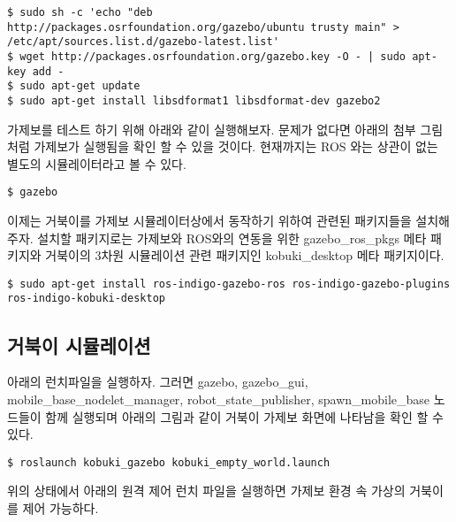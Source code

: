 \vspace{\baselineskip}
\begin{lstlisting}[language=ROS]
$ sudo sh -c 'echo "deb http://packages.osrfoundation.org/gazebo/ubuntu trusty main" > /etc/apt/sources.list.d/gazebo-latest.list'
$ wget http://packages.osrfoundation.org/gazebo.key -O - | sudo apt-key add -
$ sudo apt-get update
$ sudo apt-get install libsdformat1 libsdformat-dev gazebo2 
\end{lstlisting}

가제보를 테스트 하기 위해 아래와 같이 실행해보자. 문제가 없다면 아래의 첨부 그림처럼 가제보가 실행됨을 확인 할 수 있을 것이다. 현재까지는 ROS 와는 상관이 없는 별도의 시뮬레이터라고 볼 수 있다.

\vspace{\baselineskip}
\begin{lstlisting}[language=ROS]
$ gazebo
\end{lstlisting}

이제는 거북이를 가제보 시뮬레이터상에서 동작하기 위하여 관련된 패키지들을 설치해주자. 설치할 패키지로는 가제보와 ROS와의 연동을 위한 gazebo\_ros\_pkgs 메타 패키지와 거북이의 3차원 시뮬레이션 관련 패키지인 kobuki\_desktop 메타 패키지이다.

\vspace{\baselineskip}
\begin{lstlisting}[language=ROS]
$ sudo apt-get install ros-indigo-gazebo-ros ros-indigo-gazebo-plugins ros-indigo-kobuki-desktop
\end{lstlisting}

\subsection{거북이 시뮬레이션}

아래의 런치파일을 실행하자. 그러면 gazebo, gazebo\_gui, mobile\_base\_nodelet\_manager, robot\_state\_publisher, spawn\_mobile\_base 노드들이 함께 실행되며 아래의 그림과 같이 거북이 가제보 화면에 나타남을 확인 할 수 있다.

\vspace{\baselineskip}
\begin{lstlisting}[language=ROS]
$ roslaunch kobuki_gazebo kobuki_empty_world.launch
\end{lstlisting}

위의 상태에서 아래의 원격 제어 런치 파일을 실행하면 가제보 환경 속 가상의 거북이를 제어 가능하다.

